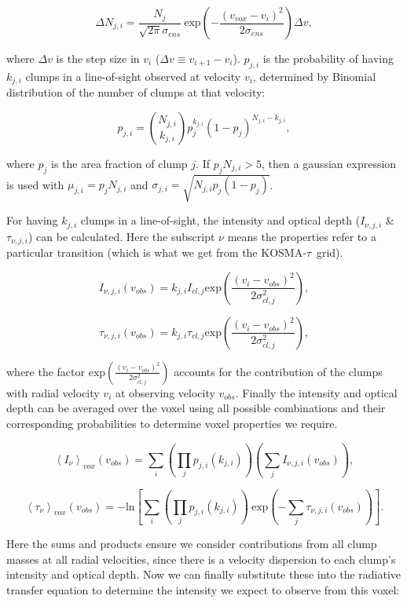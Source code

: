 \documentclass[a4paper]{article}
\newcommand{\kosmatau}{KOSMA-\(\tau\)}
\begin{document}
    \[
    \Delta N_{j,i} = \frac{N_j}{\sqrt{2 \pi} \sigma_{ens}} \ \mathrm{exp} \left( -\frac{(v_{vox}-v_i)^2}{2 \sigma_{ens}} \right) \Delta v,
    \]

    where \(\Delta v\) is the step size in \(v_i\) (\(\Delta v \equiv v_{i+1} - v_i\)).
    \(p_{j,i}\) is the probability of having \(k_{j,i}\) clumps in a line-of-sight observed at velocity \(v_i\), determined by Binomial distribution of the number of clumps at that velocity:

    \[
    p_{j,i} = \binom{N_{j,i}}{k_{j,i}} p_j^{k_{j,i}} (1-p_j)^{N_{j,i}-k_{j,i}},
    \]

    where \(p_j\) is the area fraction of clump \(j\).
    If \(p_j N_{j,i}>5\), then a gaussian expression is used with \(\mu_{j,i} = p_j N_{j,i}\) and \(\sigma_{j,i} = \sqrt{N_{j,i} p_j (1-p_j)}\).

    For having \(k_{j,i}\) clumps in a line-of-sight, the intensity and optical depth (\(I_{\nu,j,i}\) \& \(\tau_{\nu,j,i}\)) can be calculated.
    Here the subscript \(\nu\) means the properties refer to a particular transition (which is what we get from the \kosmatau \ grid).

    \[
    I_{\nu,j,i} (v_{obs}) = k_{j,i} I_{cl,j} \mathrm{exp} \left( \frac{(v_i-v_{obs})^2}{2\sigma_{cl, j}^2} \right),
    \]

    \[
    \tau_{\nu,j,i} (v_{obs}) = k_{j,i} \tau_{cl,j} \mathrm{exp} \left( \frac{(v_i-v_{obs})^2}{2\sigma_{cl, j}^2} \right),
    \]

    where the factor \(\mathrm{exp}(\frac{(v_i - v_{obs})^2}{2 \sigma_{cl, j}^2})\) accounts for the contribution of the clumps with radial velocity \(v_i\) at observing velocity \(v_{obs}\).
    Finally the intensity and optical depth can be averaged over the voxel using all possible combinations and their corresponding probabilities to determine voxel properties we require.

    \[
    \left< I_\nu \right>_{vox} (v_{obs}) = \sum_i \left( \prod_j p_{j,i}(k_{j,i}) \right) \left( \sum_j I_{\nu,j,i} (v_{obs}) \right),
    \]

    \[
    \left< \tau_\nu \right>_{vox} (v_{obs}) = -\mathrm{ln} \left[ \sum_i \left( \prod_j p_{j,i}(k_{j,i}) \right) \ \mathrm{exp} \left( - \sum_j \tau_{\nu,j,i} (v_{obs}) \right) \right].
    \]

    Here the sums and products ensure we consider contributions from all clump masses at all radial velocities, since there is a velocity dispersion to each clump's intensity and optical depth.
    Now we can finally substitute these into the radiative transfer equation to determine the intensity we expect to observe from this voxel:
\end{document}
